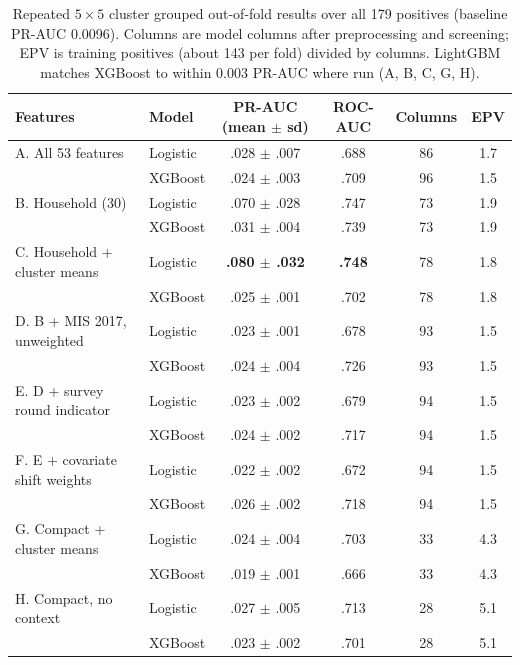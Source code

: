 \documentclass[11pt]{article}
\begin{document}
\begin{table}[t]
\centering\footnotesize
\begin{tabular}{llcccc}
\toprule
Features & Model & PR-AUC (mean $\pm$ sd) & ROC-AUC & Columns & EPV\\
\midrule
A. All 53 features & Logistic & .028 $\pm$ .007 & .688 & 86 & 1.7\\
 & XGBoost & .024 $\pm$ .003 & .709 & 96 & 1.5\\
B. Household (30) & Logistic & .070 $\pm$ .028 & .747 & 73 & 1.9\\
 & XGBoost & .031 $\pm$ .004 & .739 & 73 & 1.9\\
C. Household + cluster means & Logistic & \textbf{.080 $\pm$ .032} & \textbf{.748} & 78 & 1.8\\
 & XGBoost & .025 $\pm$ .001 & .702 & 78 & 1.8\\
D. B + MIS 2017, unweighted & Logistic & .023 $\pm$ .001 & .678 & 93 & 1.5\\
 & XGBoost & .024 $\pm$ .004 & .726 & 93 & 1.5\\
E. D + survey round indicator & Logistic & .023 $\pm$ .002 & .679 & 94 & 1.5\\
 & XGBoost & .024 $\pm$ .002 & .717 & 94 & 1.5\\
F. E + covariate shift weights & Logistic & .022 $\pm$ .002 & .672 & 94 & 1.5\\
 & XGBoost & .026 $\pm$ .002 & .718 & 94 & 1.5\\
G. Compact + cluster means & Logistic & .024 $\pm$ .004 & .703 & 33 & 4.3\\
 & XGBoost & .019 $\pm$ .001 & .666 & 33 & 4.3\\
H. Compact, no context & Logistic & .027 $\pm$ .005 & .713 & 28 & 5.1\\
 & XGBoost & .023 $\pm$ .002 & .701 & 28 & 5.1\\
\bottomrule
\end{tabular}
\caption{Repeated $5\times5$ cluster grouped out-of-fold results over all 179 positives (baseline PR-AUC 0.0096). Columns are model columns after preprocessing and screening; EPV is training positives (about 143 per fold) divided by columns. LightGBM matches XGBoost to within 0.003 PR-AUC where run (A, B, C, G, H).}
\label{tab:pooled}
\end{table}
\end{document}
